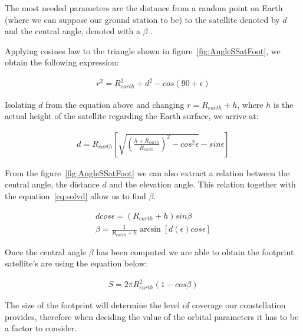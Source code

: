 The most needed parameters are the distance from a random point on Earth (where we can suppose our ground station to be) to the satellite denoted by $d$ and the central angle, denoted with a $\beta$ .
 
Applying cosines law to the triangle shown in figure~\ref{fig:AngleSSatFoot}, we obtain the following expression:
 
\begin{equation} 
\begin{gathered}
r^2=R_{earth}^2+d^2-cos(90+\epsilon)
\end{gathered}
\label{eq:Tcos}
\end{equation}
 
Isolating $d$ from the equation above and changing $r=R_{earth}+h$, where $h$ is the actual height of the satellite regarding the Earth surface, we arrive at:
 
\begin{equation}
\begin{gathered}
d=R_{earth}\left[ \sqrt{\left(\frac{h+R_{earth}}{R_{earth}}\right)^2-cos^2\epsilon}-sin\epsilon\right]
\end{gathered}
\label{eq:solvd}
\end{equation}

From the figure~\ref{fig:AngleSSatFoot} we can also extract a relation between the central angle, the distance $d$ and the elevation angle. This relation together with the equation~\ref{eq:solvd} allow us to find $\beta$. 

\begin{equation}
\begin{gathered}
d cos\epsilon=\left(R_{earth}+h\right)sin\beta \\
\beta=\frac{1}{R_{earth}+h}\arcsin\left[d(\epsilon)cos\epsilon\right]
\end{gathered}
\label{eq:solvb}
\end{equation}

Once the central angle $\beta$ has been computed we are able to obtain the footprint satellite's are using the equation below:

\begin{equation}
\begin{gathered}
S=2 \pi R_{earth}^2 (1-cos\beta)
\end{gathered}
\label{eq:solvS}
\end{equation}

The size of the footprint will determine the level of coverage our constellation provides, therefore when deciding the value of the orbital parameters it has to be a factor to consider.